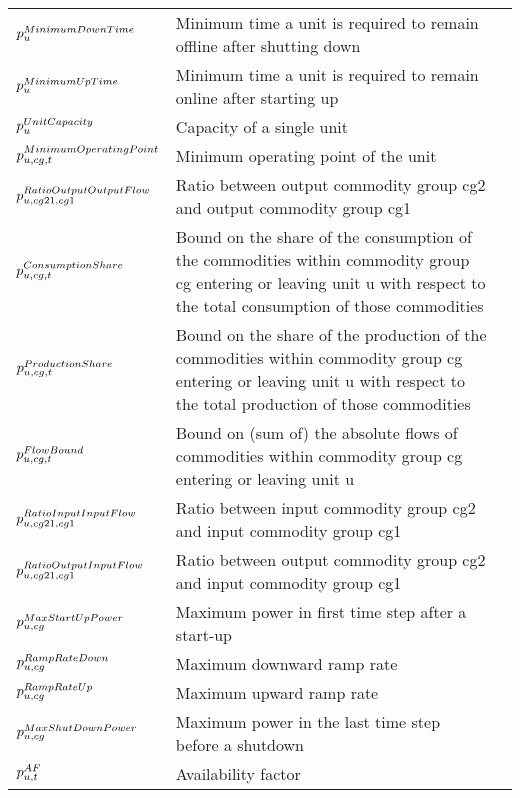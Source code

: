 \begin{longtable}{p{\cola} p{\colc} >{\small\raggedleft\arraybackslash\itshape}p{\colb}}
		$p^{MinimumDownTime}_{u}$	& Minimum time a unit is required to remain offline after shutting down	&                \\
		$p^{MinimumUpTime}_{u}$	& Minimum time a unit is required to remain online after starting up	&                \\
		$p^{UnitCapacity}_{u} $	& Capacity of a single unit                                   	&                \\
		$p^{MinimumOperatingPoint}_{u,cg,t}$	& Minimum operating point of the unit                         	&                \\
		$p^{RatioOutputOutputFlow}_{u,cg21,cg1}$	& Ratio between output commodity group cg2 and output commodity group cg1	&                \\
		$p^{ConsumptionShare}_{u,cg,t}$	& Bound on the share of the consumption of the commodities within commodity group cg entering or leaving unit u with respect to the total consumption of those commodities	&                \\
		$p^{ProductionShare}_{u,cg,t}$	& Bound on the share of the production of the commodities within commodity group cg entering or leaving unit u with respect to the total production of those commodities	&                \\
		$p^{FlowBound}_{u,cg,t}    $	& Bound on (sum of) the absolute flows of commodities within commodity group cg entering or leaving unit u 	&                \\
		$p^{RatioInputInputFlow}_{u,cg21,cg1}$	& Ratio between input commodity group cg2 and input commodity group cg1	&                \\
		$p^{RatioOutputInputFlow}_{u,cg21,cg1}$	& Ratio between output commodity group cg2 and input commodity group cg1	&                \\
		$p^{MaxStartUpPower}_{u,cg}$	& Maximum power in first time step after a start-up           	&                \\
		$p^{RampRateDown}_{u,cg} $	& Maximum downward ramp rate                                  	&                \\
		$p^{RampRateUp}_{u,cg}   $	& Maximum upward ramp rate                                    	&                \\
		$p^{MaxShutDownPower}_{u,cg}$	& Maximum power in the last time step before a shutdown       	&                \\
		$p^{AF}_{u,t}           $	& Availability factor                                         	&                \\
	\end{longtable}

